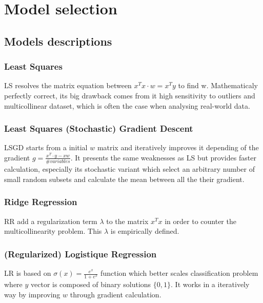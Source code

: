 \documentclass[10pt,conference,compsocconf]{IEEEtran}
\begin{document}
\section{Model selection}

\subsection{Models descriptions}

\subsubsection{Least Squares}
LS resolves the matrix equation between $x^T x \cdot w= x^T y $ to find w. Mathematicaly perfectly correct, its big drawback comes from it high sensitivity to outliers and multicollinear dataset, which is often the case when analysing real-world data.
\subsubsection{Least Squares (Stochastic) Gradient Descent}
LSGD starts from a initial $w$ matrix and iteratively improves it depending of the gradient $g = \frac{x^T \cdot y-x w}{ \# variables}$. It presents the same weaknesses as LS but provides faster calculation, especially its stochastic variant which select an arbitrary number of small random subsets and calculate the mean between all the their gradient.
\subsubsection{Ridge Regression}
RR add a regularization term $\lambda$ to the matrix $x^T x$ in order to counter the multicollinearity problem. This $\lambda$ is empirically defined.
\subsubsection{(Regularized) Logistique Regression}
LR is based on $\sigma(x) = \frac{e^x}{1 + e^x}$ function which better scales classification problem where $y$ vector is composed of binary solutions $\{0, 1\}$. It works in a iteratively way by improving $w$ through gradient calculation.







%
\end{document}

